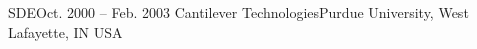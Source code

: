 \resumeSubheading
{SDE}{Oct. 2000 -- Feb. 2003}
{Cantilever Technologies}{Purdue University, West Lafayette, IN USA}
\resumeItemListStart
\resumeItemListEnd